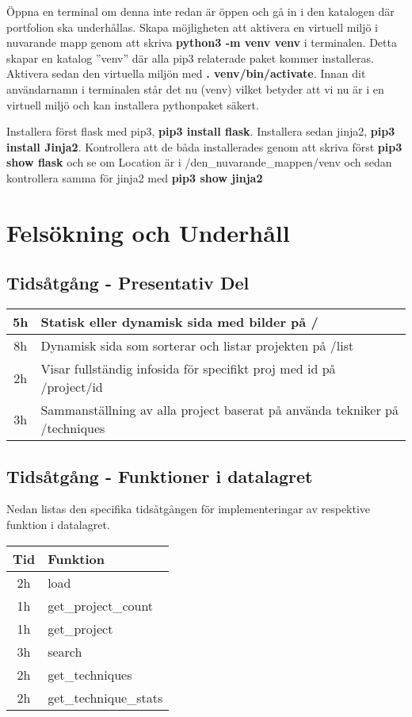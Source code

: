 \documentclass{TDP003mall}
\begin{document}
Öppna en terminal om denna inte redan är öppen och gå in i den katalogen där portfolion ska underhållas. Skapa möjligheten att aktivera en virtuell miljö i nuvarande mapp genom att skriva \textbf{python3 -m venv venv} i terminalen. Detta skapar en katalog ''venv'' där alla pip3 relaterade paket kommer installeras. Aktivera sedan den virtuella miljön med \textbf{. venv/bin/activate}. Innan dit användarnamn i terminalen står det nu (venv) vilket betyder att vi nu är i en virtuell miljö och kan installera pythonpaket säkert.

Installera först flask med pip3, \textbf{pip3 install flask}. Installera sedan jinja2, \textbf{pip3 install Jinja2}. Kontrollera att de båda installerades genom att skriva först \textbf{pip3 show flask} och se om Location är i /den_nuvarande_mappen/venv och sedan kontrollera samma för jinja2 med  \textbf{pip3 show jinja2}



\section{Felsökning och Underhåll}


\subsection{Tidsåtgång - Presentativ Del}
\begin{tabular}{|c|l|}
  \hline
  5h & Statisk eller dynamisk sida med bilder på /\\
  \hline
  8h & Dynamisk sida som sorterar och listar projekten på /list\\
  \hline
  2h & Visar fullständig infosida för specifikt proj med id på /project/id\\
  \hline
  3h & Sammanställning av alla project baserat på använda tekniker på /techniques\\
  \hline
\end{tabular}

\subsection{Tidsåtgång - Funktioner i datalagret}
Nedan listas den specifika tidsåtgången för implementeringar av respektive funktion i datalagret.

\begin{tabular}{|c|l|}
  \hline
  Tid & Funktion\\
  \hline
  2h & load\\
  \hline
  1h & get\_project\_count\\
  \hline
  1h & get\_project\\
  \hline
  3h & search\\
  \hline
  2h & get\_techniques\\
  \hline
  2h & get\_technique\_stats\\
  \hline
\end{tabular}
\end{document}

